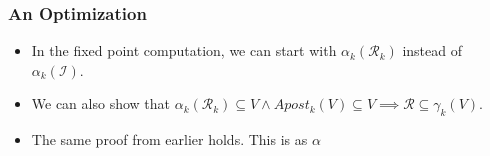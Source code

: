 \documentclass{beamer}
\begin{document}
{        \begin{frame}
            \frametitle{An Optimization}
            \begin{itemize}
                \item In the fixed point computation, we can start with $\alpha_{k}(\mathcal{R}_{k})$ instead of $\alpha_{k}(\mathcal{I})$.
                \item We can also show that $\alpha_{k}(\mathcal{R}_{k}) \subseteq V \land Apost_{k}(V) \subseteq V \implies \mathcal{R} \subseteq \gamma_{k}(V)$.
                \item The same proof from earlier holds. This is as $\alpha_{}$
            \end{itemize}
        \end{frame}
    }



            

            
            
            
            
            
            
\end{document}
